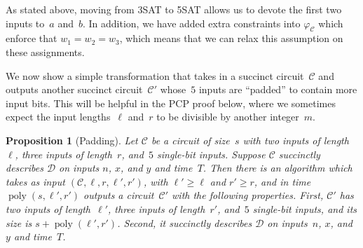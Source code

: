 \documentclass[11pt]{article}
\newtheorem{proposition}[theorem]{Proposition}
\theoremstyle{definition}
\DeclareMathOperator{\poly}{poly}
\newcommand{\decider}{\mathcal{D}}
\newcommand{\circuit}{\mathcal{C}}
\begin{document}
As stated above, moving from 3SAT to 5SAT allows us to devote the first two
inputs to~$a$ and~$b$.
In addition, we have added extra constraints into $\varphi_{\circuit}$ which
enforce that $w_1 = w_2 = w_3$, which means that we can relax this assumption on
these assignments.

We now show a simple transformation that takes in a succinct circuit~$\circuit$
and outputs another succinct circuit~$\circuit'$ whose~$5$ inputs are ``padded''
to contain more input bits.
This will be helpful in the PCP proof below, where we sometimes expect the input
lengths~$\ell$ and~$r$ to be divisible by another integer~$m$.

\begin{proposition}[Padding]\label{prop:exciting-padding-prop}
  Let $\circuit$ be a circuit of size~$s$ with two inputs of length~$\ell$,
  three inputs of length~$r$, and~$5$ single-bit inputs.
  Suppose $\circuit$ succinctly describes $\decider$ on inputs $n$, $x$, and $y$
  and time~$T$.
  Then there is an algorithm which takes as input $(\circuit, \ell, r, \ell',
  r')$, with $\ell' \geq \ell$ and $r' \geq r$, and in time~$\poly(s, \ell',
  r')$ outputs a circuit~$\circuit'$ with the following properties.
  First, $\circuit'$ has two inputs of length~$\ell'$, three inputs of
  length~$r'$, and~$5$ single-bit inputs, and its size is $s + \poly(\ell',
  r')$.
  Second, it succinctly describes $\decider$ on inputs~$n$, $x$, and~$y$ and
  time~$T$.
\end{proposition}
\end{document}
